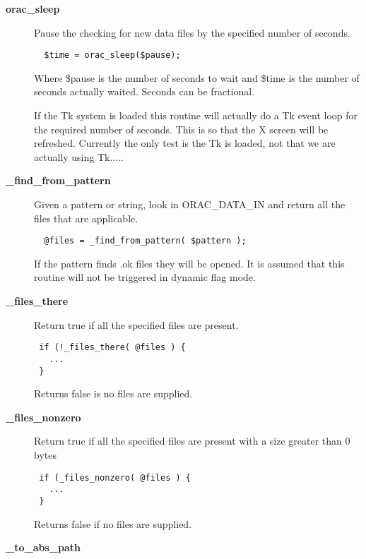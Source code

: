 \begin{description}
\item[{\textbf{orac\_sleep}}] \mbox{}

Pause the checking for new data files by the specified number of seconds.

\begin{verbatim}
  $time = orac_sleep($pause);
\end{verbatim}


Where \$pause is the number of seconds to wait and \$time is the number
of seconds actually waited. Seconds can be fractional.



If the Tk system is loaded this routine will actually do a Tk event loop
for the required number of seconds. This is so that the X screen will
be refreshed. Currently the only test is the Tk is loaded, not that
we are actually using Tk.....


\item[{\textbf{\_find\_from\_pattern}}] \mbox{}

Given a pattern or string, look in ORAC\_DATA\_IN and return all the files
that are applicable.

\begin{verbatim}
  @files = _find_from_pattern( $pattern );
\end{verbatim}


If the pattern finds .ok files they will be opened. It is assumed that this
routine will not be triggered in dynamic flag mode.


\item[{\textbf{\_files\_there}}] \mbox{}

Return true if all the specified files are present.

\begin{verbatim}
 if (!_files_there( @files ) {
   ...
 }
\end{verbatim}


Returns false is no files are supplied.


\item[{\textbf{\_files\_nonzero}}] \mbox{}

Return true if all the specified files are present with
a size greater than 0 bytes

\begin{verbatim}
 if (_files_nonzero( @files ) {
   ...
 }
\end{verbatim}


Returns false if no files are supplied.


\item[{\textbf{\_to\_abs\_path}}] \mbox{}


\end{description}

